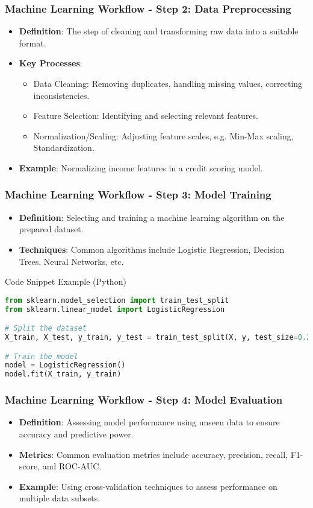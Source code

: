 \documentclass{beamer}
\begin{document}
\begin{frame}
    \frametitle{Machine Learning Workflow - Step 2: Data Preprocessing}
    \begin{itemize}
        \item \textbf{Definition}: The step of cleaning and transforming raw data into a suitable format.
        \item \textbf{Key Processes}:
            \begin{itemize}
                \item Data Cleaning: Removing duplicates, handling missing values, correcting inconsistencies.
                \item Feature Selection: Identifying and selecting relevant features.
                \item Normalization/Scaling: Adjusting feature scales, e.g. Min-Max scaling, Standardization.
            \end{itemize}
        \item \textbf{Example}: Normalizing income features in a credit scoring model.
    \end{itemize}
\end{frame}

\begin{frame}
    \frametitle{Machine Learning Workflow - Step 3: Model Training}
    \begin{itemize}
        \item \textbf{Definition}: Selecting and training a machine learning algorithm on the prepared dataset.
        \item \textbf{Techniques}: Common algorithms include Logistic Regression, Decision Trees, Neural Networks, etc.
    \end{itemize}
    \begin{block}{Code Snippet Example (Python)}
    \begin{lstlisting}[language=Python]
from sklearn.model_selection import train_test_split
from sklearn.linear_model import LogisticRegression

# Split the dataset
X_train, X_test, y_train, y_test = train_test_split(X, y, test_size=0.2, random_state=42)

# Train the model
model = LogisticRegression()
model.fit(X_train, y_train)
    \end{lstlisting}
    \end{block}
\end{frame}

\begin{frame}
    \frametitle{Machine Learning Workflow - Step 4: Model Evaluation}
    \begin{itemize}
        \item \textbf{Definition}: Assessing model performance using unseen data to ensure accuracy and predictive power.
        \item \textbf{Metrics}: Common evaluation metrics include accuracy, precision, recall, F1-score, and ROC-AUC.
        \item \textbf{Example}: Using cross-validation techniques to assess performance on multiple data subsets.
    \end{itemize}
\end{frame}
\end{document}
